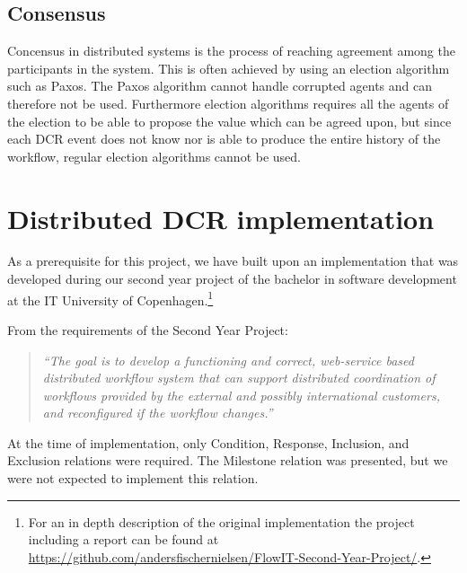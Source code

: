 		
		\subsection{Consensus}
		Concensus in distributed systems is the process of reaching agreement among the participants in the system. This is often achieved by using an election algorithm such as Paxos\cite{Lamport:1998:PP:279227.279229}. The Paxos algorithm cannot handle corrupted agents and can therefore not be used. Furthermore election algorithms requires all the agents of the election to be able to propose the value which can be agreed upon, but since each DCR event does not know nor is able to produce the entire history of the workflow, regular election algorithms cannot be used.
		
	\section{Distributed DCR implementation}
		As a prerequisite for this project, we have built upon an implementation that was developed during our second year project of the bachelor in software development at the IT University of Copenhagen.\footnote{For an in depth description of the original implementation the project including a report can be found at \url{https://github.com/andersfischernielsen/FlowIT-Second-Year-Project/}.}
		
		\newpar From the requirements of the Second Year Project:
		
		\begin{quotation}
			\noindent\textit{``The goal is to develop a functioning and correct, web-service based distributed workflow system that can support distributed coordination of workflows provided by the external and possibly international customers, and reconfigured if the workflow changes.''}
		\end{quotation}
		
		\newpar At the time of implementation, only Condition, Response, Inclusion, and Exclusion relations were required. The Milestone relation was presented, but we were not expected to implement this relation. 
		
